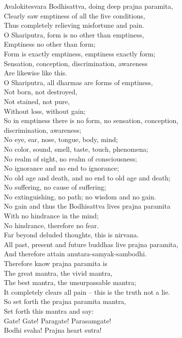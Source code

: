 \documentclass[12pt]{report}
\begin{document}
Avalokitesvara Bodhisattva, doing deep prajna paramita,\\
Clearly saw emptiness of all the five conditions,\\
Thus completely relieving misfortune and pain.\\
O Shariputra, form is no other than emptiness,\\
Emptiness no other than form;\\
Form is exactly emptiness, emptiness exactly form;\\
Sensation, conception, discrimination, awareness\\
Are likewise like this.\\
O Shariputra, all dharmas are forms of emptiness,\\
Not born, not destroyed,\\
Not stained, not pure,\\
Without loss, without gain;\\
So in emptiness there is no form, no sensation, conception,\\
discrimination, awareness;\\
No eye, ear, nose, tongue, body, mind;\\
No color, sound, smell, taste, touch, phenomena;\\
No realm of sight, no realm of consciousness;\\
No ignorance and no end to ignorance;\\
No old age and death, and no end to old age and death;\\
No suffering, no cause of suffering;\\
No extinguishing, no path; no wisdom and no gain.\\
No gain and thus the Bodhisattva lives prajna paramita\\
With no hindrance in the mind;\\
No hindrance, therefore no fear.\\
Far beyond deluded thoughts, this is nirvana.\\
All past, present and future buddhas live prajna paramita,\\
And therefore attain anutara-samyak-sambodhi.\\
Therefore know prajna paramita is\\
The great mantra, the vivid mantra,\\
The best mantra, the unsurpassable mantra;\\
It completely clears all pain -- this is the truth not a lie.\\
So set forth the prajna paramita mantra,\\
Set forth this mantra and say:\\
Gate! Gate! Paragate! Parasamgate!\\
Bodhi svaha! Prajna heart sutra!
\end{document}
